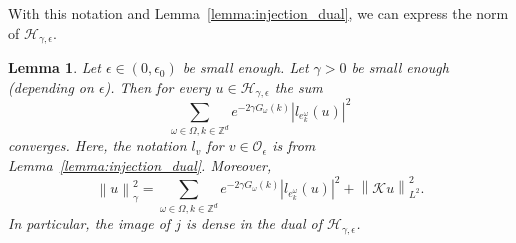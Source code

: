 \documentclass[10pt]{amsart}
\newtheorem{lemm}[theo]{Lemma}\newtheorem{prop}[theo]{Proposition}\newtheorem{coro}[theo]{Corollary}\newtheorem{conj}[theo]{Conjecture}
\theoremstyle{definition}\newtheorem{defi}[theo]{Definition}\newtheorem{rema}[theo]{Remark}\newtheorem{exam}[theo]{Example}\newtheorem{exem}[theo]{Example}\newtheorem{nota}[theo]{Notation}
\newcommand{\n}[1]{\left\|#1\right\|}
\newcommand{\va}[1]{\left|#1\right|}
\newcommand{\clO}{\mathcal{O}}
\newcommand{\clH}{\mathcal{H}}
\newcommand{\clK}{\mathcal{K}}
\newcommand{\bbZ}{\mathbb{Z}}
\begin{document}
With this notation and Lemma~\ref{lemma:injection_dual}, we can express the norm of $\clH_{\gamma,\epsilon}$.

\begin{lemm}\label{lemma:expression_norm}
Let $\epsilon \in (0,\epsilon_0)$ be small enough. Let $\gamma > 0$ be small enough (depending on $\epsilon$). Then for every $u \in \clH_{\gamma,\epsilon}$ the sum
\begin{equation}\label{eq:finite_sum}
\sum_{\omega  \in \Omega, k \in \bbZ^d} e^{-2 \gamma G_\omega(k)} \va{l_{e_k^\omega}(u)}^2
\end{equation}
converges. Here, the notation $l_v$ for $v \in \clO_\epsilon$ is from Lemma~\ref{lemma:injection_dual}. Moreover,
\begin{equation}\label{eq:expression_norm}
\n{u}_\gamma^2 = \sum_{\omega \in \Omega, k \in  \bbZ^d} e^{-2 \gamma G_\omega(k)} \va{l_{e_k^\omega}(u)}^2 + \n{\clK u}_{L^2}^2.
\end{equation}
In particular, the image of $j$ is dense in the dual of $\clH_{\gamma,\epsilon}$.
\end{lemm}
\end{document}
